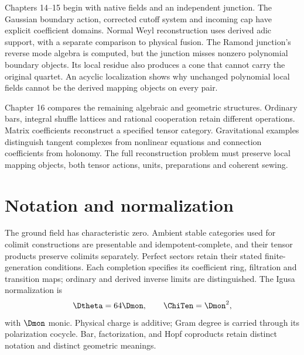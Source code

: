 \documentclass[11pt,twoside,openright]{memoir}
\begin{document}
Chapters 14--15 begin with native fields and an independent junction. The Gaussian boundary action, corrected cutoff system and incoming cap have explicit coefficient domains. Normal Weyl reconstruction uses derived adic support, with a separate comparison to physical fusion. The Ramond junction's reverse mode algebra is computed, but the junction misses nonzero polynomial boundary objects. Its local residue also produces a cone that cannot carry the original quartet. An acyclic localization shows why unchanged polynomial local fields cannot be the derived mapping objects on every pair.

Chapter 16 compares the remaining algebraic and geometric structures. Ordinary bars, integral shuffle lattices and rational cooperation retain different operations. Matrix coefficients reconstruct a specified tensor category. Gravitational examples distinguish tangent complexes from nonlinear equations and connection coefficients from holonomy. The full reconstruction problem must preserve local mapping objects, both tensor actions, units, preparations and coherent sewing.

\chapter*{Notation and normalization}
The ground field has characteristic zero. Ambient stable categories used for colimit constructions are presentable and idempotent-complete, and their tensor products preserve colimits separately. Perfect sectors retain their stated finite-generation conditions. Each completion specifies its coefficient ring, filtration and transition maps; ordinary and derived inverse limits are distinguished. The Igusa normalization is
\[
 \Dtheta=64\Dmon,\qquad \ChiTen=\Dmon^2,
\]
with $\Dmon$ monic.  Physical charge is additive; Gram degree is carried through its polarization cocycle.  Bar, factorization, and Hopf coproducts retain distinct notation and distinct geometric meanings.

\tableofcontents
\mainmatter























\backmatter


\end{document}
